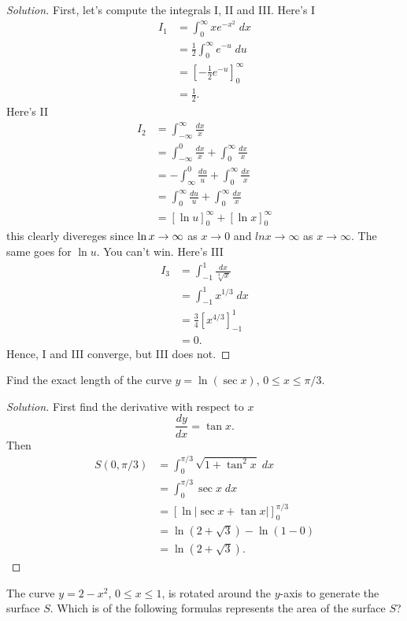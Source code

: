 \begin{proof}[Solution]
First, let's compute the integrals I, II and III. Here's I
\begin{align*}
I_1&=\int_0^\infty xe^{-x^2}\;dx\\
   &=\frac{1}{2}\int_0^\infty e^{-u}\;du\\
   &=\left[-\frac{1}{2}e^{-u}\right]_0^\infty\\
   &=\frac{1}{2}.
\end{align*}
Here's II
\begin{align*}
I_2&=\int_{-\infty}^\infty\frac{dx}{x}\\
&=\int_{-\infty}^0\frac{dx}{x}+\int_0^\infty\frac{dx}{x}\\
&=-\int_\infty^0\frac{du}{u}+\int_0^\infty\frac{dx}{x}\\
&=\int_0^\infty\frac{du}{u}+\int_0^\infty\frac{dx}{x}\\
&=\left[\ln u\right]_0^\infty+\left[\ln x\right]_0^\infty
\end{align*}
this clearly divereges since $\ln x\to\-\infty$ as $x\to 0$ and $ln
x\to\infty$ as $x\to\infty$. The same goes for $\ln u$. You can't
win. Here's III
\begin{align*}
I_3&=\int_{-1}^1\frac{dx}{\sqrt[3]{x}}\\
   &=\int_{-1}^1x^{1/3}\;dx\\
   &=\frac{3}{4}\left[x^{4/3}\right]_{-1}^1\\
   &=0.
\end{align*}
Hence, I and III converge, but III does not.
\end{proof}
\begin{problem}
Find the exact length of the curve $y=\ln(\sec x)$, $0\leq x\leq\pi/3$.
\end{problem}
\begin{proof}[Solution]
First find the derivative with respect to $x$
\[
\frac{dy}{dx}=\tan x.
\]
Then
\begin{align*}
S(0,\pi/3)
&=\int_0^{\pi/3}\sqrt{1+\tan^2x}\;dx\\
&=\int_0^{\pi/3}\sec x\;dx\\
&=\left[\ln|\sec x+\tan x|\right]_0^{\pi/3}\\
&=\ln\left(2+\sqrt{3}\right)-\ln(1-0)\\
&=\boxed{\ln\left(2+\sqrt{3}\right).}
\end{align*}
\end{proof}
\begin{problem}
The curve $y=2-x^2$, $0\leq x\leq 1$, is rotated around the $y$-axis to
generate the surface $S$. Which is of the following formulas represents the
area of the surface $S$?
\end{problem}
